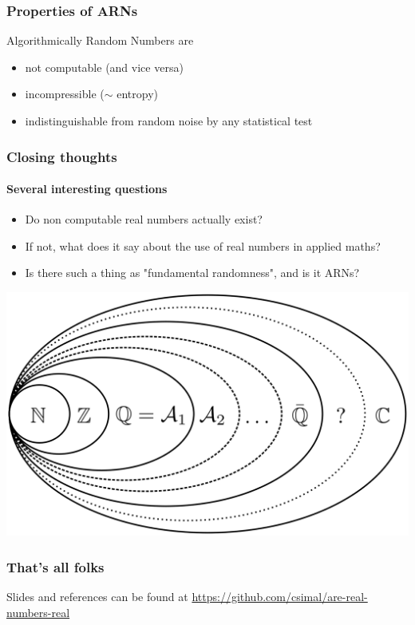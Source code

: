 \documentclass{beamer}
\begin{document}
\begin{frame}
    \frametitle{Properties of ARNs}
    Algorithmically Random Numbers are
    \begin{itemize}
        \item not computable (and vice versa)
        \item incompressible ($\sim$ entropy)
        \item indistinguishable from random noise by any statistical test
    \end{itemize}
    
\end{frame}

\begin{frame}
    \frametitle{Closing thoughts}
    \framesubtitle{Several interesting questions}
    \begin{itemize}
        \item Do non computable real numbers actually exist?
        \item If not, what does it say about the use of real numbers in applied maths?
        \item Is there such a thing as "fundamental randomness", and is it ARNs?
    \end{itemize}
\end{frame}

\begin{frame}
    \begin{center}
        \includegraphics[width=.8\textwidth]{images/numbers.png}
    \end{center}
\end{frame}

\begin{frame}
    \frametitle{That's all folks}
    Slides and references can be found at
    \url{https://github.com/csimal/are-real-numbers-real}
\end{frame}
\end{document}
